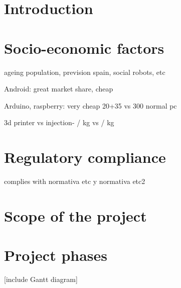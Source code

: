\section{Introduction}




\section{Socio-economic factors}

ageing population, prevision spain, social robots, etc


Android: great market share, cheap

Arduino, raspberry: very cheap 20+35  vs 300 normal pc

3d printer vs injection- / kg vs / kg




\section{Regulatory compliance}

complies with normativa etc y normativa etc2

\section{Scope of the project}

\section{Project phases}
[include Gantt diagram]




